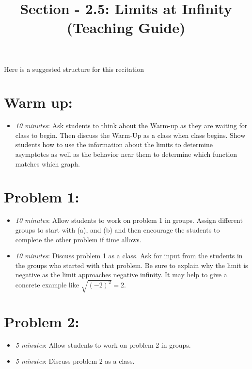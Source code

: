 \documentclass[handout,nooutcomes]{ximera}
\title{Section - 2.5:  Limits at Infinity (Teaching Guide)}
\begin{document}
\begin{abstract}		\end{abstract}
\maketitle

Here is a suggested structure for this recitation

\section*{Warm up:} 
	
	\begin{itemize}
	
	\item  \emph{10 minutes}:  Ask students to think about the Warm-up as they are waiting for class to begin.  Then discuss the Warm-Up as a class when class begins. Show students how to use the information about the limits to determine asymptotes as well as the behavior near them to determine which function matches which graph.
	
	\end{itemize}


\section*{Problem 1:}

	\begin{itemize}
	
	\item  \emph{10 minutes}:  Allow students to work on problem 1 in groups.  Assign different groups to start with (a), and (b) and then encourage the students to complete the other problem if time allows.  
	
	\item  \emph{10 minutes}:  Discuss problem 1 as a class.  Ask for input from the students in the groups who started with that problem.  Be sure to explain why the limit is negative as the limit approaches negative infinity.  It may help to give a concrete example like $\sqrt{(-2)^2} = 2$.  
		
	\end{itemize}
	
	
	
\section*{Problem 2:}

	\begin{itemize}
	
	\item  \emph{5 minutes}:  Allow students to work on problem 2 in groups. 
	
	\item  \emph{5 minutes}:  Discuss problem 2 as a class.   
	
	\end{itemize}
	
\end{document}
